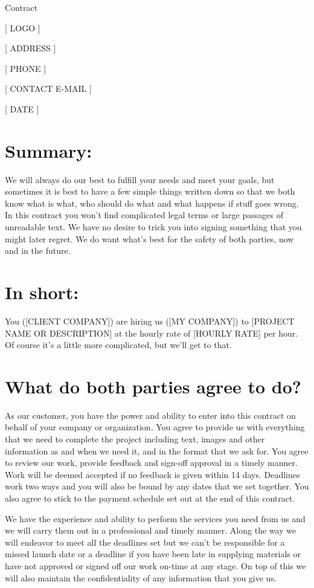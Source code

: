 \documentclass[10pt,a4paper,parskip]{scrartcl}
\begin{document}
\begin{center} {\Large Contract} \end{center}

[ LOGO ]

[ ADDRESS ]

[ PHONE ]

[ CONTACT E-MAIL ]

[ DATE ]

\section{Summary:}

We will always do our best to fulfill your needs and meet your goals, but
sometimes it is best to have a few simple things written down so that we both
know what is what, who should do what and what happens if stuff goes wrong. In
this contract you won't find complicated legal terms or large passages of
unreadable text. We have no desire to trick you into signing something that you
might later regret. We do want what's best for the safety of both parties, now
and in the future.

\section{In short:}

You ([CLIENT COMPANY]) are hiring us ([MY COMPANY]) to [PROJECT NAME OR
DESCRIPTION] at the hourly rate of [HOURLY RATE] per hour. Of course it's a
little more complicated, but we'll get to that.

\section{What do both parties agree to do?}

As our customer, you have the power and ability to enter into this contract on
behalf of your company or organization. You agree to provide us with everything
that we need to complete the project including text, images and other
information as and when we need it, and in the format that we ask for. You
agree to review our work, provide feedback and sign-off approval in a timely
manner. Work will be deemed accepted if no feedback is given within 14 days.
Deadlines work two ways and you will also be bound by any dates that we
set together. You also agree to stick to the payment schedule set out at the
end of this contract.

We have the experience and ability to perform the services you need from us and
we will carry them out in a professional and timely manner. Along the way we
will endeavor to meet all the deadlines set but we can't be responsible for a
missed launch date or a deadline if you have been late in supplying materials
or have not approved or signed off our work on-time at any stage. On top of
this we will also maintain the confidentiality of any information that you give
us.
\end{document}
